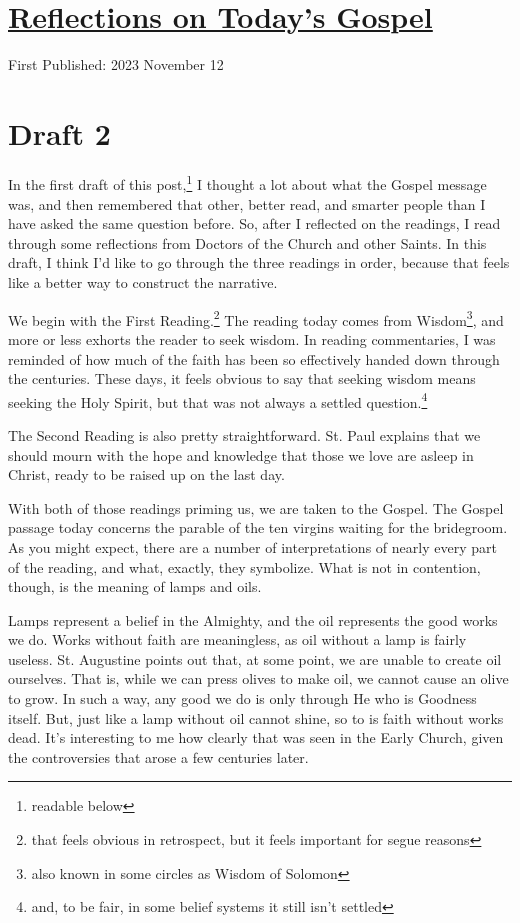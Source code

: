 \documentclass[12pt]{article}[titlepage]
\newcommand{\1}{\={a}}
\newcommand{\2}{\={e}}
\newcommand{\3}{\={\i}}
\newcommand{\4}{\=o}
\newcommand{\5}{\=u}
\newcommand{\6}{\={A}}
\renewcommand{\,}{\textsuperscript{,}}
\begin{document}

\doublespacing
\section{\href{reflections-on-readings-32-ordinary-a-23.html}{Reflections on Today's Gospel}}
First Published: 2023 November 12

\section{Draft 2}
In the first draft of this post,\footnote{readable below} I thought a lot about what the Gospel message was, and then remembered that other, better read, and smarter people than I have asked the same question before.
So, after I reflected on the readings, I read through some reflections from Doctors of the Church and other Saints.
In this draft, I think I'd like to go through the three readings in order, because that feels like a better way to construct the narrative.

We begin with the First Reading.\footnote{that feels obvious in retrospect, but it feels important for segue reasons}
The reading today comes from Wisdom\footnote{also known in some circles as Wisdom of Solomon}, and more or less exhorts the reader to seek wisdom.
In reading commentaries, I was reminded of how much of the faith has been so effectively handed down through the centuries.
These days, it feels obvious to say that seeking wisdom means seeking the Holy Spirit, but that was not always a settled question.\footnote{and, to be fair, in some belief systems it still isn't settled}

The Second Reading is also pretty straightforward.
St. Paul explains that we should mourn with the hope and knowledge that those we love are asleep in Christ, ready to be raised up on the last day.

With both of those readings priming us, we are taken to the Gospel.
The Gospel passage today concerns the parable of the ten virgins waiting for the bridegroom.
As you might expect, there are a number of interpretations of nearly every part of the reading, and what, exactly, they symbolize.
What is not in contention, though, is the meaning of lamps and oils.

Lamps represent a belief in the Almighty, and the oil represents the good works we do.
Works without faith are meaningless, as oil without a lamp is fairly useless.
St. Augustine points out that, at some point, we are unable to create oil ourselves.
That is, while we can press olives to make oil, we cannot cause an olive to grow.
In such a way, any good we do is only through He who is Goodness itself.
But, just like a lamp without oil cannot shine, so to is faith without works dead.
It's interesting to me how clearly that was seen in the Early Church, given the controversies that arose a few centuries later.
\end{document}

